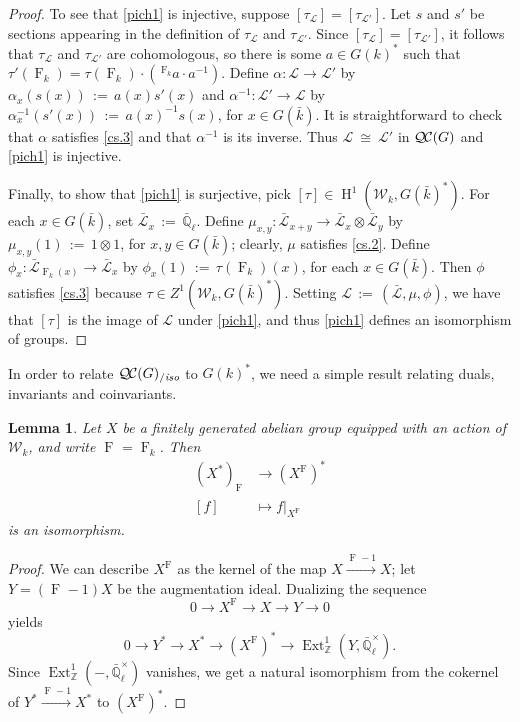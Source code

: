 \documentclass[11pt]{amsart}
\theoremstyle{plain}
\newtheorem{lemma}[theorem]{Lemma}
\theoremstyle{definition}
\theoremstyle{remark}
\newcommand{\ZZ}{{\mathbb{Z}}}
\newcommand{\EE}{\mathbb{\bar Q}_\ell}
\newcommand{\bFq}{\bar{k}}
\newcommand{\Fq}{k}
\newcommand{\EEx}{\EE^\times}
\newcommand{\Frob}[1]{\operatorname{F}_{#1}}
\DeclareMathOperator{\Ext}{Ext}
\DeclareMathOperator{\Hh}{H}
\newcommand{\ceq}{{\, :=\, }}
\newcommand{\iso}{{\ \cong\ }}
\newcommand{\qcs}[1]{{\mathcal{#1}}}
\newcommand{\gqcs}[1]{{\mathcal{\bar #1}}}
\newcommand{\QC}{{\mathcal{Q\hskip-0.8pt C}}}
\newcommand{\QCiso}[1]{\QC(#1)_{/\textit{iso}}}
\newcommand{\Weil}[1]{\mathcal{W}_{#1}}
\begin{document}
\begin{proof}
 
 To see that \eqref{pich1} is injective,
 suppose $[\tau_\qcs{L}] = [\tau_\qcs{L'}]$.
 Let $s$ and $s'$ be sections appearing in the definition of $\tau_\qcs{L}$ and $\tau_\qcs{L'}$.
 Since $[\tau_\qcs{L}] = [\tau_\qcs{L'}]$, 
 it follows that $\tau_\qcs{L}$ and $\tau_{\qcs{L'}}$ are cohomologous, 
 so there is some $a\in G(\Fq)^*$ such that 
 $\tau'(\Frob{\Fq}) = \tau(\Frob{\Fq}) \cdot (\,^{\Frob{\Fq}}a \cdot a^{-1})$. 
 Define $\alpha : \qcs{L}\to \qcs{L'}$ by $\alpha_x(s(x)) \ceq a(x) s'(x)$ and $\alpha^{-1} : \qcs{L}'\to \qcs{L}$
 by $\alpha^{-1}_x(s'(x)) \ceq a(x)^{-1} s(x)$, for $x\in G(\bFq)$.
 It is straightforward to check that $\alpha$ satisfies \ref{cs.3}
 and that $\alpha^{-1}$ is its inverse. Thus $\qcs{L} \iso \qcs{L'}$ in $\QC(G)$ and \eqref{pich1} is injective.
  

 Finally, to show that \eqref{pich1} is surjective, pick $[\tau]\in \Hh^1(\Weil{\Fq}, G(\bFq)^*)$.
 For each $x\in G(\bFq)$, set $\gqcs{L}_x \ceq \EE$.
 Define $\mu_{x,y} : \gqcs{L}_{x+y} \to \gqcs{L}_x\otimes \gqcs{L}_y$ by
 $\mu_{x,y}(1) \ceq 1\otimes1$, for $x,y\in G(\bFq)$; 
 clearly, $\mu$ satisfies \ref{cs.2}.
 Define $\phi_x : \gqcs{L}_{\Frob{\Fq}(x)} \to \gqcs{L}_x$ by $\phi_x(1) \ceq \tau(\Frob{\Fq})(x)$,
 for each $x\in G(\bFq)$. 
 Then $\phi$ satisfies \ref{cs.3} because $\tau \in Z^1(\Weil{\Fq},G(\bFq)^*)$.
 Setting $\qcs{L} \ceq (\gqcs{L},\mu,\phi)$, we have that $[\tau]$ is the image of $\qcs{L}$
 under \eqref{pich1}, and thus \eqref{pich1} defines an isomorphism of groups.
\end{proof}

In order to relate $\QCiso{G}$ to $G(k)^*$, we need a simple result relating duals, invariants and coinvariants.

\begin{lemma} \label{lem:dual-inv}
Let $X$ be a finitely generated abelian group equipped with an action of $\Weil{\Fq}$, and write $\Frob{} = \Frob{\Fq}$.  Then
\begin{align*}
 (X^*)_{\Frob{}} &\to (X^{\Frob{}})^* \\
 [f] &\mapsto f|_{X^{\Frob{}}}
\end{align*}
is an isomorphism.
\end{lemma}
\begin{proof}
We can describe $X^{\Frob{}}$ as the kernel of the map $X \xrightarrow{\Frob{}-1} X$;
let $Y = (\Frob{}-1)X$ be the augmentation ideal.  Dualizing the sequence
\[
 0 \to X^{\Frob{}} \to X \to Y \to 0
\]
yields
\[
 0 \to Y^* \to X^* \to (X^{\Frob{}})^* \to \Ext^1_\ZZ(Y, \EEx).
\]
Since $\Ext^1_\ZZ(-,\EEx)$ vanishes, we get a natural isomorphism from the cokernel of $Y^* \xrightarrow{\Frob{}-1} X^*$ to $(X^{\Frob{}})^*$.
\end{proof}
\end{document}
